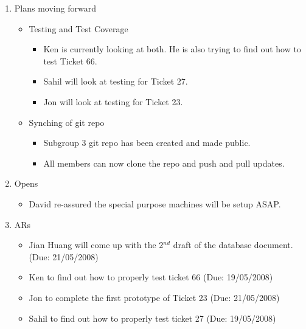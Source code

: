 \documentclass{letter}
\begin{document}
\begin{enumerate}
\begin{itemize}
\begin{itemize}
				\end{itemize}
		\end{itemize}
	\item Plans moving forward
		\begin{itemize}
			\item Testing and Test Coverage
				\begin{itemize}
					\item Ken is currently looking at both. He is also trying to find out how to test Ticket 66.
					\item Sahil will look at testing for Ticket 27.
					\item Jon will look at testing for Ticket 23.
				\end{itemize}
			\item Synching of git repo
				\begin{itemize}
					\item Subgroup 3 git repo has been created and made public.
					\item All members can now clone the repo and push and pull updates.
				\end{itemize}
		\end{itemize}
	\item Opens
		\begin{itemize}
			\item David re-assured the special purpose machines will be setup ASAP.
		\end{itemize}
	\item ARs
		\begin{itemize}
			\item Jian Huang will come up with the 2$^{nd}$ draft of the database document. (Due: 21/05/2008)
			\item Ken to find out how to properly test ticket 66 (Due: 19/05/2008)
			\item Jon to complete the first prototype of Ticket 23 (Due: 21/05/2008)
			\item Sahil to find out how to properly test ticket 27 (Due: 19/05/2008)
		\end{itemize}
\end{enumerate} 
\end{document}
